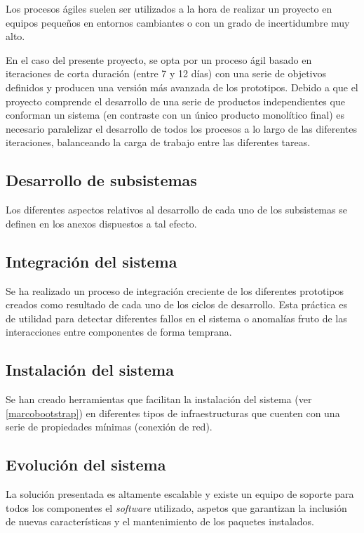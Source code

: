 Los procesos ágiles suelen ser utilizados a la hora de realizar un proyecto en equipos pequeños en entornos cambiantes o con un grado de incertidumbre muy alto.

En el caso del presente proyecto, se opta por un proceso ágil basado en iteraciones de corta duración (entre 7 y 12 días) con una serie de objetivos definidos y producen una versión más avanzada de los prototipos. Debido a que el proyecto comprende el desarrollo de una serie de productos independientes que conforman un sistema (en contraste con un único producto monolítico final) es necesario paralelizar el desarrollo de todos los procesos a lo largo de las diferentes iteraciones, balanceando la carga de trabajo entre las diferentes tareas.

\subsection{Desarrollo de subsistemas}
Los diferentes aspectos relativos al desarrollo de cada uno de los subsistemas se definen en los anexos dispuestos a tal efecto.

\subsection{Integración del sistema}

Se ha realizado un proceso de integración creciente de los diferentes prototipos creados como resultado de cada uno de los ciclos de desarrollo. Esta práctica es de utilidad para detectar diferentes fallos en el sistema o anomalías fruto de las interacciones entre componentes de forma temprana.

\subsection{Instalación del sistema}

Se han creado herramientas que facilitan la instalación del sistema (ver \ref{marcobootstrap}) en diferentes tipos de infraestructuras que cuenten con una serie de propiedades mínimas (conexión de red).
\subsection{Evolución del sistema}

La solución presentada es altamente escalable y existe un equipo de soporte para todos los componentes el \textit{software} utilizado, aspetos que garantizan la inclusión de nuevas características y el mantenimiento de los paquetes instalados.  

